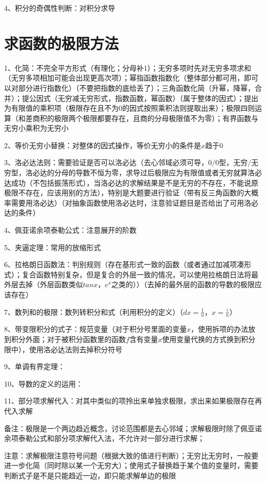 4、积分的奇偶性判断：对积分求导

\section{求函数的极限方法}

1、化简：不完全平方形式（有理化；分母补1）；无穷多项时先对无穷多项求和（无穷多项相加可能会出现更高次项）；幂指函数指数化（整体部分都可用，即可以对部分进行指数化）（不要把指数的底给丢了）；三角函数化简（升幂，降幂，合并）；提公因式（无穷减无穷形式，指数函数，幂函数）（属于整体的因式）；提出为有限值的乘积项（极限存在且不为0的因式按照乘积法则提取出来）；极限四则运算（和差商积的极限两个极限都要存在，且商的分母极限值不为零）；有界函数与无穷小乘积为无穷小

2、等价无穷小替换：对整体的因式操作，等价无穷小的条件是$x$趋于0

3、洛必达法则：需要验证是否可以洛必达（去心邻域必须可导，0/0型，无穷/无穷型，洛必达的分母的导数不恒为零，求导过后极限应为有限值或者无穷就算洛必达成功（不包括振荡形式），当洛必达的求解结果是不是无穷的不存在，不能说原极限不存在，应该用别的方法），特别是大题要进行验证（带有反三角函数的大概率需要用洛必达）（对抽象函数使用洛必达时，注意验证题目是否给出了可用洛必达的条件）

4、佩亚诺余项泰勒公式：注意展开的阶数

5、夹逼定理：常用的放缩形式

6、拉格朗日函数法：判别规则（存在基形式一致的函数（或者通过加减项凑形式）；复合函数特别复杂，但是复合的外层一致的情况，可以使用拉格朗日法将最外层去掉（外层函数类似$tanx$，$e^x$之类的））（去掉的最外层的函数的导数的极限应该存在）

7、数列和的极限：数列转积分和式（利用积分的定义）（$dx=\frac{1}{n}$，$x=\frac{i}{n}$）

8、带变限积分的式子：规范变量（对于积分号里面的变量$x$，使用拆项的办法放到积分外面；对于被积分函数里的函数$f$含有变量$x$使用变量代换的方式换到积分限中），使用洛必达法则去掉积分符号

9、单调有界定理：

10、导数的定义的运用：

11、部分项求解代入：对其中类似的项拎出来单独求极限，求出来如果极限存在再代入求解

备注：极限是一个两边趋近概念，讨论范围都是去心邻域；求解极限时除了佩亚诺余项泰勒公式和部分项求解代入法，不允许对一部分进行求解；

注意：求解极限注意符号问题（根据大致的值进行判断）；无穷比无穷时，一般要进一步化简（同时除以某一个无穷大）；使用式子替换趋于某个值的变量时，需要判断式子是不是只能趋近一边，即只能求解单边的极限

